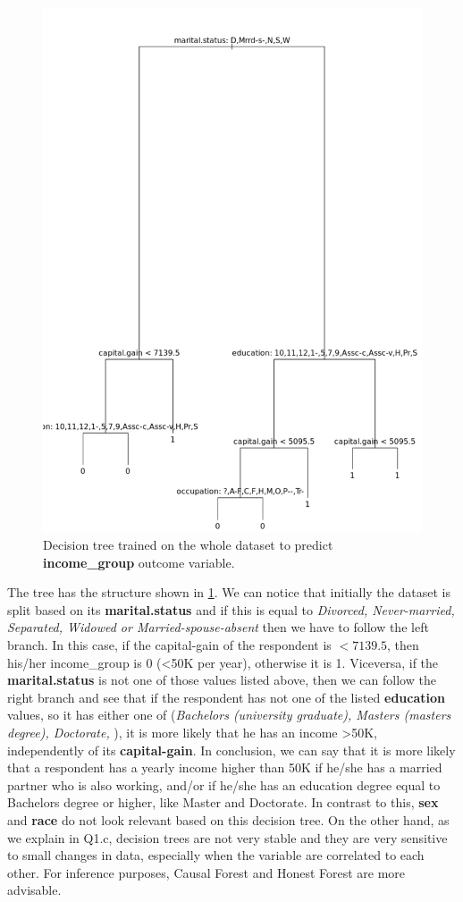 \documentclass[12pt,twoside]{article}
\begin{document}
\begin{enumerate}
\begin{enumerate}
\begin{figure}[ht]
		\includegraphics[width=12cm]{decision_tree}
		\caption{Decision tree trained on the whole dataset to predict \textbf{income\_group} outcome variable.}
		\label{fig:decision_tree}
	\end{figure}
	The tree has the structure shown in \ref{fig:decision_tree}. We can notice that initially the dataset is split based on its \textbf{marital.status} and if this is equal to \textit{Divorced, Never-married, Separated, Widowed or Married-spouse-absent} then we have to follow the left branch. In this case, if the capital-gain of the respondent is $< 7139.5$, then his/her income\_group is 0 (<50K per year), otherwise it is 1.
	Viceversa, if the \textbf{marital.status} is not one of those values listed above, then we can follow the right branch and see that if the respondent has not one of the listed \textbf{education} values, so it has either one of (\textit{Bachelors (university graduate), Masters (masters degree), Doctorate, }), it is more likely that he has an income >50K, independently of its \textbf{capital-gain}.
	In conclusion, we can say that it is more likely that a respondent has a yearly income higher than 50K if he/she has a married partner who is also working, and/or if he/she has an education degree equal to Bachelors degree or higher, like Master and Doctorate. In contrast to this, \textbf{sex} and \textbf{race} do not look relevant based on this decision tree. On the other hand, as we explain in Q1.c, decision trees are not very stable and they are very sensitive to small changes in data, especially when the variable are correlated to each other. For inference purposes, Causal Forest and Honest Forest are more advisable.
	

\end{enumerate}
\end{enumerate}
\end{document}
